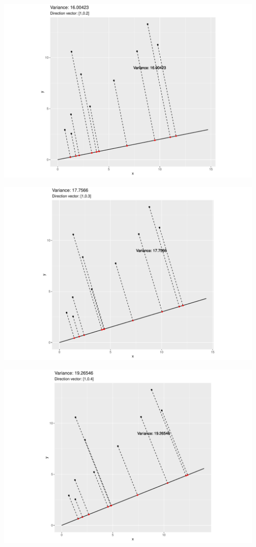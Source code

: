 \documentclass[
  ignorenonframetext,
]{beamer}
\begin{document}
\begin{frame}{}
\protect\hypertarget{section-2}{}
\includegraphics{note9_files/figure-beamer/unnamed-chunk-9-1.pdf}
\end{frame}

\begin{frame}{}
\protect\hypertarget{section-3}{}
\includegraphics{note9_files/figure-beamer/unnamed-chunk-10-1.pdf}
\end{frame}

\begin{frame}{}
\protect\hypertarget{section-4}{}
\includegraphics{note9_files/figure-beamer/unnamed-chunk-11-1.pdf}
\end{frame}
\end{document}
